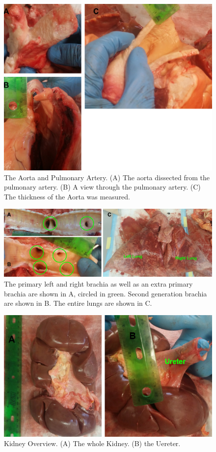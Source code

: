 \documentclass[12pt]{article}
\begin{document}
\begin{figure}[H]
	
	\centering	
	\includegraphics[width = 1\textwidth]{Figures/Heart5.png}
	\caption{The Aorta and Pulmonary Artery. (A) The aorta dissected from the pulmonary artery. (B) A view through the pulmonary artery. (C) The thickness of the Aorta was measured.}
	\label{fig:H5}
\end{figure}
\begin{figure}[H]
	
	\centering	
	\includegraphics[width = 1\textwidth]{Figures/Lung1.png}
	\caption{The primary left and right brachia as well as an extra primary brachia are shown in A, circled in green. Second generation brachia are shown in B. The entire lungs are shown in C.}
	\label{fig:L1}
\end{figure}
\begin{figure}[H]
	
	\centering	
	\includegraphics[width = 1\textwidth]{Figures/Kidney1.png}
	\caption{Kidney Overview. (A) The whole Kidney. (B) the Uereter.}
	\label{fig:K1}
\end{figure}
\end{document}

